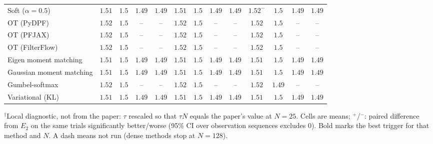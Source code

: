 \begin{table}[ht]
\begin{adjustbox}{max width=\linewidth}
\begin{tabular}{lcccc|cccc|cccc}
Soft ($\alpha{=}0.5$) & $1.51$ & $1.5$ & $\mathbf{1.49}$ & $1.49$ & $\mathbf{1.51}$ & $\mathbf{1.5}$ & $1.49$ & $\mathbf{1.49}$ & $1.52^{-}$ & $1.5$ & $1.49$ & $1.49$ \\
OT (PyDPF) & $1.52$ & $1.5$ & -- & -- & $\mathbf{1.52}$ & $1.5$ & -- & -- & $1.52$ & $\mathbf{1.5}$ & -- & -- \\
OT (PFJAX) & $1.52$ & $1.5$ & -- & -- & $\mathbf{1.52}$ & $1.5$ & -- & -- & $1.52$ & $\mathbf{1.5}$ & -- & -- \\
OT (FilterFlow) & $1.52$ & $1.5$ & -- & -- & $\mathbf{1.52}$ & $1.5$ & -- & -- & $1.52$ & $\mathbf{1.5}$ & -- & -- \\
Eigen moment matching & $1.51$ & $1.5$ & $\mathbf{1.49}$ & $\mathbf{1.49}$ & $1.51$ & $1.5$ & $1.49$ & $1.49$ & $\mathbf{1.51}$ & $\mathbf{1.5}$ & $1.49$ & $1.49$ \\
Gaussian moment matching & $1.51$ & $1.5$ & $1.49$ & $\mathbf{1.49}$ & $1.51$ & $\mathbf{1.5}$ & $1.49$ & $1.49$ & $\mathbf{1.51}$ & $1.5$ & $\mathbf{1.49}$ & $1.49$ \\
Gumbel-softmax & $\mathbf{1.52}$ & $1.5$ & -- & -- & $1.52$ & $1.5$ & -- & -- & $1.52$ & $\mathbf{1.49}$ & -- & -- \\
Variational (KL) & $1.51$ & $\mathbf{1.5}$ & $1.49$ & $1.49$ & $\mathbf{1.51}$ & $1.5$ & $1.49$ & $\mathbf{1.49}$ & $1.51$ & $1.5$ & $\mathbf{1.49}$ & $1.49$ \\
\bottomrule
\end{tabular}
\end{adjustbox}
\par\smallskip\parbox{0.95\linewidth}{\footnotesize $^\dagger$Local diagnostic, not from the paper: $\tau$ rescaled so that $\tau N$ equals the paper's value at $N{=}25$. Cells are means; $^{+}$/$^{-}$: paired difference from $E_2$ on the same trials significantly better/worse (95\% CI over observation sequences excludes 0). Bold marks the best trigger for that method and $N$. A dash means not run (dense methods stop at $N{=}128$).}
\end{table}

